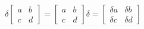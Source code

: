 \documentclass[12 pt]{slides}
\begin{document}
\begingroup
\[\delta\begin{bmatrix}a & b\\c & d\end{bmatrix} = \begin{bmatrix}a & b\\c & d\end{bmatrix}\delta = \begin{bmatrix}\delta a & \delta b\\\delta c & \delta d\end{bmatrix}\]
\endgroup
\end{document}
